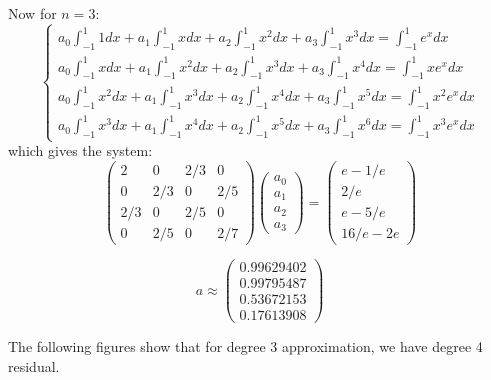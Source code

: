 \documentclass[12pt]{article} %
\newcommand{\1}[1]{\mathds{1}\left[#1\right]}
\begin{document}
Now for $n=3$:
$$
\begin{cases}
		a_0\int_{-1}^1 1dx +a_1\int_{-1}^1xdx + a_2\int_{-1}^1x^2dx+a_3\int_{-1}^1x^3dx= \int_{-1}^1e^xdx \\
		a_0\int_{-1}^1 xdx +a_1\int_{-1}^1x^2dx + a_2\int_{-1}^1x^3dx+ a_3\int_{-1}^1x^4dx= \int_{-1}^1xe^xdx\\
		a_0\int_{-1}^1 x^2dx +a_1\int_{-1}^1x^3dx + a_2\int_{-1}^1x^4dx+ a_3\int_{-1}^1x^5dx= \int_{-1}^1x^2e^xdx\\
		a_0\int_{-1}^1 x^3dx +a_1\int_{-1}^1x^4dx + a_2\int_{-1}^1x^5dx+ a_3\int_{-1}^1x^6dx= \int_{-1}^1x^3e^xdx
\end{cases}
$$ which gives the system:
$$
\begin{pmatrix}
	2 & 0 & 2/3 & 0\\
	0 & 2/3 & 0 & 2/5 \\
	2/3 & 0 & 2/5 & 0 \\
	0 & 2/5 & 0 & 2/7
\end{pmatrix}
\begin{pmatrix}
a_0\\
a_1\\
a_2\\
a_3
\end{pmatrix} = 
\begin{pmatrix}
e-1/e\\
2/e\\
e-5/e\\
16/e-2e
\end{pmatrix}
$$	

$$
	a \approx
	\begin{pmatrix}
		0.99629402\\0.99795487\\0.53672153\\0.17613908
	\end{pmatrix}
$$

The following figures show that for degree 3 approximation, we have degree 4 residual.
\end{document}
